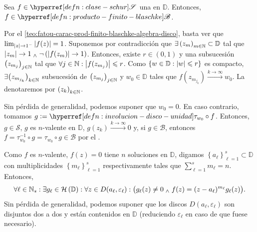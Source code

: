 \begin{teo}\label{teo:carac-prod-finito-blaschke-clase-schur-valencia}
    Sea $f \in \exhyperref[defn:clase-schur]{clase-schur}{\mathscr{S}}$ una  en $\mathbb{D}$. Entonces, $f \in \exhyperref[defn:producto-finito-blaschke]{producto-finito-blaschke}{\mathscr{B}}$.
\end{teo}
\begin{dem}
    Por el \cref{teo:fatou-carac-prod-finito-blaschke-algebra-disco}, basta ver que $\lim_{\left|z\right| \to 1^-} \left|f(z)\right| = 1$. Suponemos por contradicción que $\exists \left(z_m\right)_{m\in \mathbb{N}} \subset \mathbb{D}$ tal que $\left|z_m\right| \to 1 \; _{\wedge} \; \neg \left(\left|f(z_m)\right| \to 1\right)$. Entonces, existe $r \in (0, 1)$ y una subsucesión $\left(z_{m_j}\right)_{j \in \mathbb{N}}$ tal que $\forall j \in \mathbb{N} : \left|f(z_{m_j})\right| \leqslant r$. Como $\left\{w \in \mathbb{D} : \left|w\right| \leqslant r\right\}$ es compacto, $\exists \big(z_{m_{j_k}}\big)_{k \in \mathbb{N}}$ subsucesión de $\left(z_{m_j}\right)_{j \in \mathbb{N}}$ y $w_0 \in \mathbb{D}$ tales que $f(z_{m_{j_k}}) \xrightarrow{k \to \infty} w_0$. La denotaremos por $\left(z_k\right)_{k \in \mathbb{N}}$.

    Sin pérdida de generalidad, podemos suponer que $w_0 = 0$. En caso contrario, tomamos $g \defeq \exhyperref[defn:involucion-disco-unidad]{involucion-disco-unidad}{\tau_{w_0}} \circ f$. Entonces, $g \in \mathscr{S}$, $g$ es $n$-valente en $\mathbb{D}$, $g(z_k) \xrightarrow{k \to \infty} 0$ y, si $g \in \mathscr{B}$, entonces $f = \tau_{w_0}^{-1} \circ g = \tau_{w_0} \circ g \in \mathscr{B}$ por el .

    Como $f$ es $n$-valente, $f(z) = 0$ tiene $n$ soluciones en $\mathbb{D}$, digamos $\left\{a_\ell\right\}_{\ell=1}^s \subset \mathbb{D}$ con multiplicidades $\left\{m_\ell\right\}_{\ell=1}^s$ respectivamente tales que $\sum_{\ell=1}^s m_\ell = n$. Entonces,
    \[
    \forall \ell \in \mathbb{N}_s : \exists g_\ell \in \mathcal{H}\left(\mathbb{D}\right) : \forall z \in D(a_\ell, \varepsilon_\ell) : \bigl(g_\ell(z) \neq 0 \; _{\wedge} \; f(z) = (z - a_\ell)^{m_\ell} g_\ell(z)\bigr).
    \]
    Sin pérdida de generalidad, podemos suponer que los discos $D(a_\ell, \varepsilon_\ell)$ son disjuntos dos a dos y están contenidos en $\mathbb{D}$ (reduciendo $\varepsilon_\ell$ en caso de que fuese necesario).
    

\end{dem}
